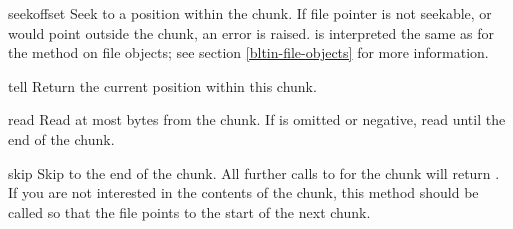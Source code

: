 \begin{methoddesc}{seek}{offset}
Seek to a position within the chunk. If file pointer is not seekable,
or  would point outside the chunk, an error is raised.
 is interpreted the same as for the  method
on file objects; see section \ref{bltin-file-objects} for more
information.
\end{methoddesc}

\begin{methoddesc}{tell}{}
Return the current position within this chunk.
\end{methoddesc}

\begin{methoddesc}{read}{}
Read at most  bytes from the chunk. If  is omitted
or negative, read until the end of the chunk.
\end{methoddesc}

\begin{methoddesc}{skip}{}
Skip to the end of the chunk.  All further calls to 
for the chunk will return .  If you are not interested in the
contents of the chunk, this method should be called so that the file
points to the start of the next chunk.
\end{methoddesc}
